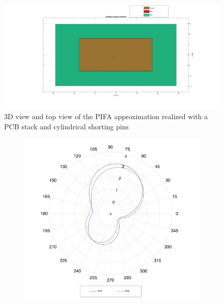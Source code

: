 \documentclass[12pt,a4paper]{article}
\begin{document}
{\begin{center}
\begin{figure}[h]
			\includegraphics[scale=0.2]{pcb_shorting_pins_top_view.pdf}
		\caption{3D view and top view of the PIFA approximation realized with a PCB stack and cylindrical shorting pins}
		\label{fig:pcb shorting}
	\end{figure}
\end{center}
\begin{figure}[h]
	\begin{center}
		\begin{subfigure}{0.5\linewidth}
			\includegraphics[scale=0.3]{pifa_pcb_null_azymuth_comparison.pdf}
			\caption{}
		\end{subfigure}
		\begin{subfigure}{0.5\linewidth}

\end{subfigure}
\end{center}
\end{figure}}
\end{document}
